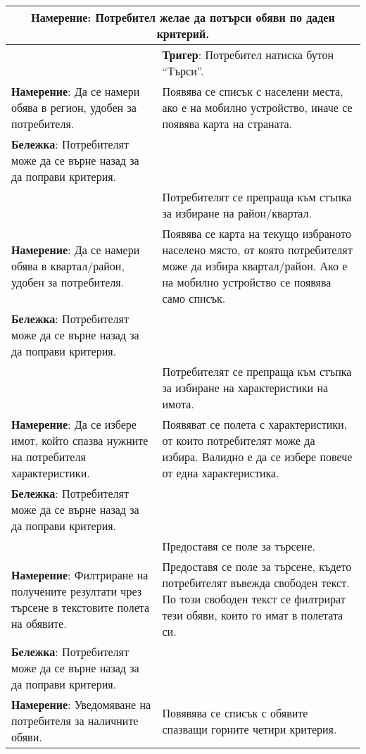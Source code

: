 \documentclass[a4paper,12pt]{article}
\begin{document}
\begin{center}
  \begin{tabular}{ |p{5cm}|p{10cm}| }
    \hline
    \multicolumn{2}{|c|}{\textbf{Намерение}: Потребител желае да потърси обяви по даден критерий.} \\
    \hline
    & \textbf{Тригер}: Потребител натиска бутон ``Търси''. \\
    \hline
    \textbf{Намерение}: Да се намери обява в регион, удобен за потребителя. & Появява се списък с населени места, ако е на мобилно устройство, иначе се появява карта на страната. \\
    \hline
    \textbf{Бележка}: Потребителят може да се върне назад за да поправи критерия. & \\
    \hline
      & Потребителят се препраща към стъпка за избиране на район/квартал. \\
    \hline
    \textbf{Намерение}: Да се намери обява в квартал/район, удобен за потребителя. & Появява се карта на текущо избраното населено място, от която потребителят може да избира квартал/район. Ако е на мобилно устройство се появява само списък. \\
    \hline
    \textbf{Бележка}: Потребителят може да се върне назад за да поправи критерия. & \\
    \hline
     & Потребителят се препраща към стъпка за избиране на характеристики на имота. \\
    \hline
    \textbf{Намерение}: Да се избере имот, който спазва нужните на потребителя характеристики. & Появяват се полета с характеристики, от които потребителят може да избира. Валидно е да се избере повече от една характеристика. \\
    \hline
    \textbf{Бележка}: Потребителят може да се върне назад за да поправи критерия. & \\
    \hline
     & Предоставя се поле за търсене. \\
    \hline
    \textbf{Намерение}: Филтриране на получените резултати чрез търсене в текстовите полета на обявите. & Предоставя се поле за търсене, където потребителят въвежда свободен текст. По този свободен текст се филтрират тези обяви, които го имат в полетата си. \\
    \hline
    \textbf{Бележка}: Потребителят може да се върне назад за да поправи критерия. & \\
    \hline
    \textbf{Намерение}: Уведомяване на потребителя за наличните обяви. & Повявява се списък с обявите спазващи горните четири критерия. \\
    \hline
  \end{tabular}
\end{center}
\end{document}
